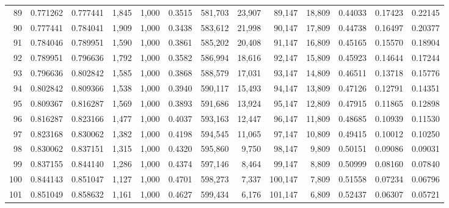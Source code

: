 \begin{tabular}{rrrrrrrrrrrrr}
89  &  0.771262 &  0.777441 &   1,845 &  1,000 &                                     0.3515 &  581,703 &   23,907 &   89,147 &   18,809 &  0.44033 &  0.17423 &  0.22145 \\
90  &  0.777441 &  0.784041 &   1,909 &  1,000 &                                     0.3438 &  583,612 &   21,998 &   90,147 &   17,809 &  0.44738 &  0.16497 &  0.20377 \\
91  &  0.784046 &  0.789951 &   1,590 &  1,000 &                                     0.3861 &  585,202 &   20,408 &   91,147 &   16,809 &  0.45165 &  0.15570 &  0.18904 \\
92  &  0.789951 &  0.796636 &   1,792 &  1,000 &                                     0.3582 &  586,994 &   18,616 &   92,147 &   15,809 &  0.45923 &  0.14644 &  0.17244 \\
93  &  0.796636 &  0.802842 &   1,585 &  1,000 &                                     0.3868 &  588,579 &   17,031 &   93,147 &   14,809 &  0.46511 &  0.13718 &  0.15776 \\
94  &  0.802842 &  0.809366 &   1,538 &  1,000 &                                     0.3940 &  590,117 &   15,493 &   94,147 &   13,809 &  0.47126 &  0.12791 &  0.14351 \\
95  &  0.809367 &  0.816287 &   1,569 &  1,000 &                                     0.3893 &  591,686 &   13,924 &   95,147 &   12,809 &  0.47915 &  0.11865 &  0.12898 \\
96  &  0.816287 &  0.823166 &   1,477 &  1,000 &                                     0.4037 &  593,163 &   12,447 &   96,147 &   11,809 &  0.48685 &  0.10939 &  0.11530 \\
97  &  0.823168 &  0.830062 &   1,382 &  1,000 &                                     0.4198 &  594,545 &   11,065 &   97,147 &   10,809 &  0.49415 &  0.10012 &  0.10250 \\
98  &  0.830062 &  0.837151 &   1,315 &  1,000 &                                     0.4320 &  595,860 &    9,750 &   98,147 &    9,809 &  0.50151 &  0.09086 &  0.09031 \\
99  &  0.837155 &  0.844140 &   1,286 &  1,000 &                                     0.4374 &  597,146 &    8,464 &   99,147 &    8,809 &  0.50999 &  0.08160 &  0.07840 \\
100 &  0.844143 &  0.851047 &   1,127 &  1,000 &                                     0.4701 &  598,273 &    7,337 &  100,147 &    7,809 &  0.51558 &  0.07234 &  0.06796 \\
101 &  0.851049 &  0.858632 &   1,161 &  1,000 &                                     0.4627 &  599,434 &    6,176 &  101,147 &    6,809 &  0.52437 &  0.06307 &  0.05721 \\

\end{tabular}
